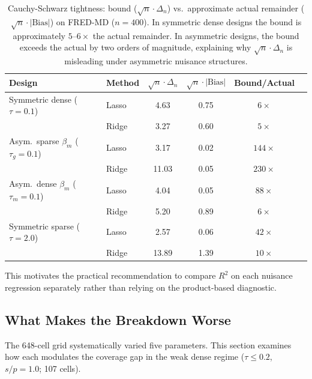 \documentclass[a4paper,10.5pt]{article}
\begin{document}
\begin{table}[H]
\centering
\small
\caption{Cauchy-Schwarz tightness: bound ($\sqrt{n}\cdot\Delta_n$) vs.\ approximate actual remainder ($\sqrt{n}\cdot|\text{Bias}|$) on FRED-MD ($n = 400$). In symmetric dense designs the bound is approximately $5$--$6\times$ the actual remainder. In asymmetric designs, the bound exceeds the actual by two orders of magnitude, explaining why $\sqrt{n}\cdot\Delta_n$ is misleading under asymmetric nuisance structures.}
\label{tab:cauchy}
\begin{tabular}{llcccc}
\toprule
Design & Method & $\sqrt{n}\cdot\Delta_n$ & $\sqrt{n}\cdot|\text{Bias}|$ & Bound/Actual \\
\midrule
Symmetric dense ($\tau = 0.1$) & Lasso & 4.63 & 0.75 & $6\times$ \\
                                & Ridge & 3.27 & 0.60 & $5\times$ \\
\midrule
Asym.\ sparse $\beta_m$ ($\tau_g = 0.1$) & Lasso & 3.17 & 0.02 & $144\times$ \\
                                          & Ridge & 11.03 & 0.05 & $230\times$ \\
\midrule
Asym.\ dense $\beta_m$ ($\tau_m = 0.1$) & Lasso & 4.04 & 0.05 & $88\times$ \\
                                          & Ridge & 5.20 & 0.89 & $6\times$ \\
\midrule
Symmetric sparse ($\tau = 2.0$) & Lasso & 2.57 & 0.06 & $42\times$ \\
                                 & Ridge & 13.89 & 1.39 & $10\times$ \\
\bottomrule
\end{tabular}
\end{table}

This motivates the practical recommendation to compare $R^2$ on each nuisance regression separately rather than relying on the product-based diagnostic.



\subsection{What Makes the Breakdown Worse}\label{sec:sensitivity}

The 648-cell grid systematically varied five parameters. This section examines how each modulates the coverage gap in the weak dense regime ($\tau \leq 0.2$, $s/p = 1.0$; 107 cells).
\end{document}
